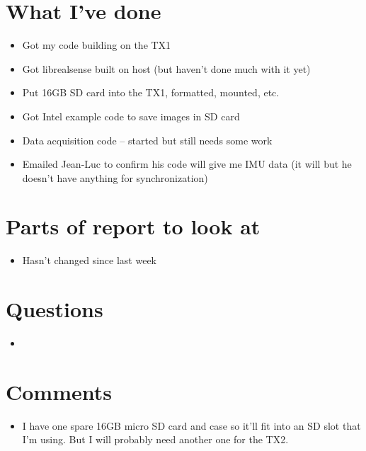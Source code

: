 \documentclass[12pt,a4paper]{article}
\begin{document}
\author{Katrina Ashton}


\pagestyle{fancy}
\fancyhf{}
\rhead{\thepage}

\section{What I've done}
\begin{itemize}
\item{Got my code building on the TX1}
\item{Got librealsense built on host (but haven't done much with it yet)}
\item{Put 16GB SD card into the TX1, formatted, mounted, etc.}
\item{Got Intel example code to save images in SD card}
\item{Data acquisition code -- started but still needs some work}
\item{Emailed Jean-Luc to confirm his code will give me IMU data (it will but he doesn't have anything for synchronization)}
\end{itemize}

\section{Parts of report to look at}
\begin{itemize}
\item{Hasn't changed since last week}
\end{itemize}

\section{Questions}
\begin{itemize}
\item{}
\end{itemize}

\section{Comments}
\begin{itemize}
\item{I have one spare 16GB micro SD card and case so it'll fit into an SD slot that I'm using. But I will probably need another one for the TX2.}
\end{itemize}
\end{document}
